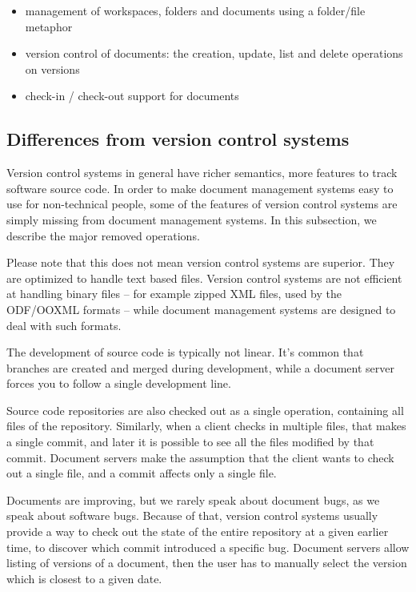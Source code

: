 \begin{itemize}
\item management of workspaces, folders and documents using a folder/file metaphor
\item version control of documents: the creation, update, list and delete operations on versions
\item check-in / check-out support for documents
\end{itemize}

\subsection{Differences from version control systems}

Version control systems in general have richer semantics, more features to
track software source code. In order to make document management systems easy
to use for non-technical people, some of the features of version control
systems are simply missing from document management systems. In this
subsection, we describe the major removed operations.

Please note that this does not mean version control systems are superior. They are
optimized to handle text based files. Version control systems
are not efficient at handling binary files -- for example zipped XML files, used by
the ODF/OOXML formats -- while document management systems are designed to deal
with such formats.

The development of source code is typically not linear. It's common that
branches are created and merged during development, while a document server
forces you to follow a single development line.

Source code repositories are also checked out as a single operation,
containing all files of the repository. Similarly, when a client checks in
multiple files, that makes a single commit, and later it is possible to see all
the files modified by that commit. Document servers make the assumption that
the client wants to check out a single file, and a commit affects only a single
file.

Documents are improving, but we rarely speak about document bugs, as we speak
about software bugs. Because of that, version control systems usually provide a
way to check out the state of the entire repository at a given earlier
time, to discover which commit introduced a specific bug. Document servers
allow listing of versions of a document, then the user has to manually select
the version which is closest to a given date.

